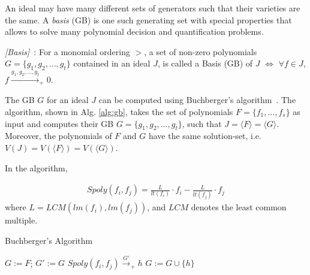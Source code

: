 An ideal may have many different sets of generators such that
their varieties are the same. A {\it \Grobner basis} (GB) is
one such generating set with special properties that allows 
to solve many polynomial decision and quantification problems. 
\begin{Definition}
\label{def:gb}
{\it  [\Grobner Basis]}~\cite{gb_book}: 
For a monomial ordering $>$, a set of non-zero polynomials $G =
\{g_1,g_2,\dots,g_t\}$ contained in an ideal $J$, is called a
\Grobner Basis (GB) of $J$ $\iff$
$\forall f \in J$, $f\xrightarrow{g_1,g_2,\dots,g_t}_+0$. 
\end{Definition}
The GB $G$ for an ideal $J$ can be computed using Buchberger's
algorithm~\cite{buchberger_thesis}. 
The algorithm, shown in Alg. \ref{alg:gb}, takes the set of
polynomials $F = \{f_1,\dots, f_s\}$ as input and computes their
GB $G = \{g_1,g_2,\dots, g_t\}$, such that $J = \langle
F\rangle = \langle G\rangle$. Moreover, the polynomials of $F$ and $G$
have the same solution-set, i.e. $V(J) = V(\langle F \rangle) = V(\langle G \rangle)$. 

In the algorithm,

\begin{equation}
\label{spoly}
\begin{split}
Spoly(f_i,f_j) = \frac{L}{lt(f_i)}\cdot f_i - \frac{L}{lt(f_j)}\cdot f_j
\end{split}
\end{equation}
where $L = LCM(lm(f_i),lm(f_j))$, and $LCM$ denotes the least common
multiple. 

\begin{algorithm}
\caption {Buchberger's Algorithm}
\label{alg:gb}
\begin{algorithmic}[1]
  \State $G:= F$;
    \State $G' := G$
      \State $Spoly(f_i, f_j) \stackrel{G'}{\textstyle\longrightarrow}_+h$ 
       \State $G:= G \cup \{h\}$ \EndIf
    \EndFor
  \EndWhile
\end{algorithmic}
\end{algorithm}

